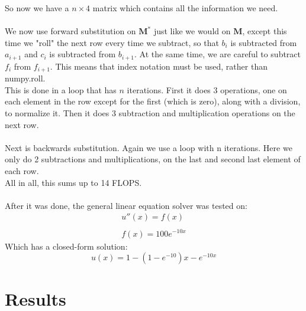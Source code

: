 \documentclass[a4paper,12pt,norsk]{article}
\begin{document}
	So now we have a $n \times 4$ matrix which contains all the information we need.\\
	\\
	We now use forward substitution on $\textbf{M}^*$ just like we would on $\textbf{M}$, except this time we "roll" the next row every time we subtract, so that $b_i$ is subtracted from $a_{i+1}$ and $c_i$ is subtracted from $b_{i+1}$. At the same time, we are careful to subtract $f_i$ from $f_{i+1}$. This means that index notation must be used, rather than numpy.roll.\\
	This is done in a loop that has $n$ iterations. First it does 3 operations, one on each element in the row except for the first (which is zero), along with a division, to normalize it. Then it does 3 subtraction and multiplication operations on the next row.\\
	\\
	Next is backwards substitution. Again we use a loop with n iterations. Here we only do 2 subtractions and multiplications, on the last and second last element of each row.\\
	All in all, this sums up to 14 FLOPS.\\
	\\
	After it was done, the general linear equation solver was tested on:
	\begin{gather*}
		u''(x) = f(x)\\
		\\
		f(x) = 100e^{-10x}
	\end{gather*}
	Which has a closed-form solution:
	$$u(x) = 1 - (1 - e^{-10})x - e^{-10x} $$
	
\section{Results}
\end{document}
